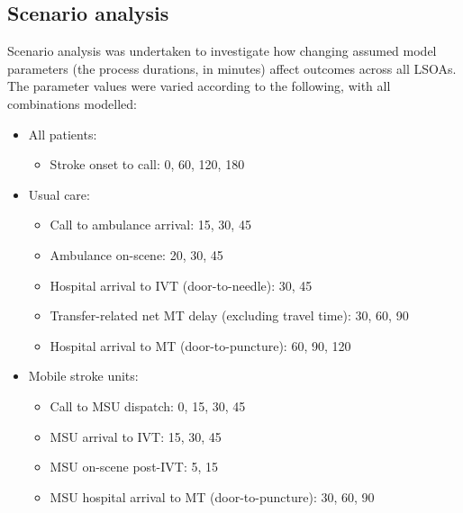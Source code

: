 \subsection{Scenario analysis}

Scenario analysis was undertaken to investigate how changing assumed model parameters (the process durations, in minutes) affect outcomes across all LSOAs. The parameter values were varied according to the following, with all combinations modelled:

\begin{minipage}{1.0\textwidth}  %
\begin{spacing}{1.2}
\begin{itemize}
    \item All patients:
    \begin{itemize}
        \item Stroke onset to call: 0, 60, 120, 180
    \end{itemize}
    \item Usual care:
    \begin{itemize}
        \item Call to ambulance arrival: 15, 30, 45
        \item Ambulance on-scene: 20, 30, 45
        \item Hospital arrival to IVT (door-to-needle): 30, 45
        \item Transfer-related net MT delay (excluding travel time): 30, 60, 90
        \item Hospital arrival to MT (door-to-puncture): 60, 90, 120
    \end{itemize}
    \item Mobile stroke units:
    \begin{itemize}
        \item Call to MSU dispatch: 0, 15, 30, 45
        \item MSU arrival to IVT: 15, 30, 45
        \item MSU on-scene post-IVT: 5, 15
        \item MSU hospital arrival to MT (door-to-puncture): 30, 60, 90
    \end{itemize}
\end{itemize}
\end{spacing}
\end{minipage}

